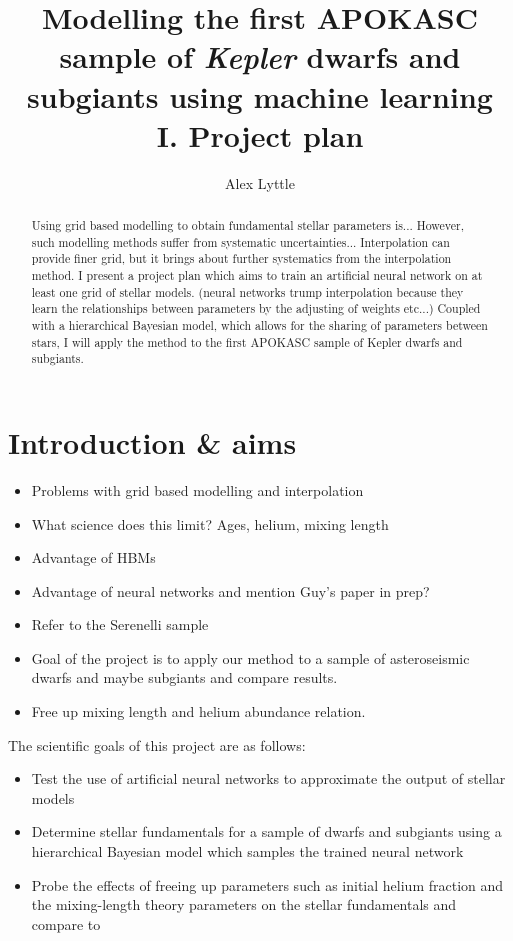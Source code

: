 \documentclass[twocolumn]{aastex63}
\begin{document}
\title{Modelling the first APOKASC sample of \textit{Kepler} dwarfs and subgiants using machine learning\\I. Project plan}
\author{Alex Lyttle}

\begin{abstract}

Using grid based modelling to obtain fundamental stellar parameters is... However, such modelling methods suffer from systematic uncertainties... Interpolation can provide finer grid, but it brings about further systematics from the interpolation method. I present a project plan which aims to train an artificial neural network on at least one grid of stellar models. (neural networks trump interpolation because they learn the relationships between parameters by the adjusting of weights etc...) Coupled with a hierarchical Bayesian model, which allows for the sharing of parameters between stars, I will apply the method to the first APOKASC sample of Kepler dwarfs and subgiants.

\end{abstract}


\section{Introduction \& aims}


\begin{itemize}
    \item Problems with grid based modelling and interpolation
    \item What science does this limit? Ages, helium, mixing length
    \item Advantage of HBMs
    \item Advantage of neural networks and mention Guy's paper in prep?
    \item Refer to the Serenelli sample
    \item Goal of the project is to apply our method to a sample of asteroseismic dwarfs and maybe subgiants and compare results.
    \item Free up mixing length and helium abundance relation.
\end{itemize}

The scientific goals of this project are as follows:

\begin{itemize}
    \item Test the use of artificial neural networks to approximate the output of stellar models
    \item Determine stellar fundamentals for a sample of dwarfs and subgiants using a hierarchical Bayesian model which samples the trained neural network
    \item Probe the effects of freeing up parameters such as initial helium fraction and the mixing-length theory parameters on the stellar fundamentals and compare to 
\end{itemize}
\end{document}
